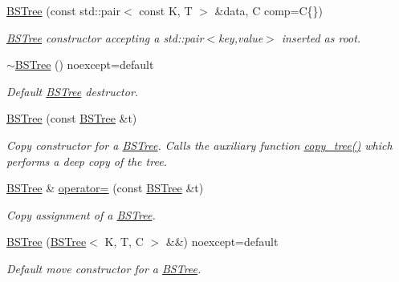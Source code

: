 \begin{DoxyCompactItemize}
\hyperlink{class_b_s_tree_aa688700e2b3298d2c59ecb505522daf2}{B\+S\+Tree} (const std\+::pair$<$ const K, T $>$ \&data, C comp=C\{\})
\begin{DoxyCompactList}\small\item\em \hyperlink{class_b_s_tree}{B\+S\+Tree} constructor accepting a std\+::pair$<$key,value$>$ inserted as root. \end{DoxyCompactList}\item 
\mbox{\label{class_b_s_tree_a875eb7debc36c3972bc9fb6b486cd64d}} 
\hyperlink{class_b_s_tree_a875eb7debc36c3972bc9fb6b486cd64d}{$\sim$\+B\+S\+Tree} () noexcept=default
\begin{DoxyCompactList}\small\item\em Default \hyperlink{class_b_s_tree}{B\+S\+Tree} destructor. \end{DoxyCompactList}\item 
\hyperlink{class_b_s_tree_ab02cf77eca992f95d44c4ada43a914c0}{B\+S\+Tree} (const \hyperlink{class_b_s_tree}{B\+S\+Tree} \&t)
\begin{DoxyCompactList}\small\item\em Copy constructor for a \hyperlink{class_b_s_tree}{B\+S\+Tree}. Calls the auxiliary function \hyperlink{class_b_s_tree_ad34bd4cfe46ab5a5376cc242b1901f2b}{copy\+\_\+tree()} which performs a deep copy of the tree. \end{DoxyCompactList}\item 
\hyperlink{class_b_s_tree}{B\+S\+Tree} \& \hyperlink{class_b_s_tree_a51e883c53f2604130eeabecc73a2a95a}{operator=} (const \hyperlink{class_b_s_tree}{B\+S\+Tree} \&t)
\begin{DoxyCompactList}\small\item\em Copy assignment of a \hyperlink{class_b_s_tree}{B\+S\+Tree}. \end{DoxyCompactList}\item 
\mbox{\label{class_b_s_tree_a6f8861897a87ab1944edbaf7754648b4}} 
\hyperlink{class_b_s_tree_a6f8861897a87ab1944edbaf7754648b4}{B\+S\+Tree} (\hyperlink{class_b_s_tree}{B\+S\+Tree}$<$ K, T, C $>$ \&\&) noexcept=default
\begin{DoxyCompactList}\small\item\em Default move constructor for a \hyperlink{class_b_s_tree}{B\+S\+Tree}. \end{DoxyCompactList}\item 
\mbox{\label{class_b_s_tree_a555de0952655377d903ecbc1ce6bdec3}} 

\end{DoxyCompactItemize}
